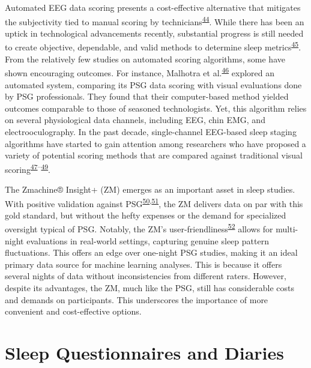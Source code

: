 \documentclass[
  10pt,
]{scrbook}
\begin{document}
Automated EEG data scoring presents a cost-effective alternative that
mitigates the subjectivity tied to manual scoring by
technicians\textsuperscript{\protect\hyperlink{ref-redline_2013}{44}}.
While there has been an uptick in technological advancements recently,
substantial progress is still needed to create objective, dependable,
and valid methods to determine sleep
metrics\textsuperscript{\protect\hyperlink{ref-berthomier_2013}{45}}.
From the relatively few studies on automated scoring algorithms, some
have shown encouraging outcomes. For instance, Malhotra et
al.\textsuperscript{\protect\hyperlink{ref-malhotra_2013}{46}} explored
an automated system, comparing its PSG data scoring with visual
evaluations done by PSG professionals. They found that their
computer-based method yielded outcomes comparable to those of seasoned
technologists. Yet, this algorithm relies on several physiological data
channels, including EEG, chin EMG, and electrooculography. In the past
decade, single-channel EEG-based sleep staging algorithms have started
to gain attention among researchers who have proposed a variety of
potential scoring methods that are compared against traditional visual
scoring\textsuperscript{\protect\hyperlink{ref-koley_2012}{47}--\protect\hyperlink{ref-zhu_2014}{49}}.

The Zmachine® Insight+ (ZM) emerges as an important asset in sleep
studies. With positive validation against
PSG\textsuperscript{\protect\hyperlink{ref-kaplan_performance_2014}{50},\protect\hyperlink{ref-wang_evaluation_2015}{51}},
the ZM delivers data on par with this gold standard, but without the
hefty expenses or the demand for specialized oversight typical of PSG.
Notably, the ZM's
user-friendliness\textsuperscript{\protect\hyperlink{ref-pedersen_self-administered_2021}{52}}
allows for multi-night evaluations in real-world settings, capturing
genuine sleep pattern fluctuations. This offers an edge over one-night
PSG studies, making it an ideal primary data source for machine learning
analyses. This is because it offers several nights of data without
inconsistencies from different raters. However, despite its advantages,
the ZM, much like the PSG, still has considerable costs and demands on
participants. This underscores the importance of more convenient and
cost-effective options.

\hypertarget{sleep-questionnaires-and-diaries}{%
\section{Sleep Questionnaires and
Diaries}\label{sleep-questionnaires-and-diaries}}
\end{document}
